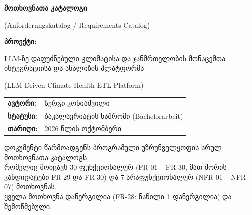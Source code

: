 \documentclass[11pt,a4paper]{article}
\begin{document}
\begin{titlepage}
\centering
\vspace*{2.5cm}

{\huge\bfseries\color{brandgreen} მოთხოვნათა კატალოგი\par}
\vspace{0.4cm}
{\Large (Anforderungskatalog / Requirements Catalog)\par}
\vspace{1.2cm}

{\large\textbf{პროექტი:}\par}
\vspace{0.2cm}
{\Large LLM-ზე დაფუძნებული კლიმატისა და ჯანმრთელობის მონაცემთა ინტეგრაციისა და ანალიზის პლატფორმა\par}
\vspace{0.3cm}
{\normalsize (LLM-Driven Climate-Health ETL Platform)\par}

\vspace{2.5cm}

\begin{tabular}{ll}
\textbf{ავტორი:} & სერგი კონიაშვილი \\
\textbf{სტატუსი:} & ბაკალავრიატის ნაშრომი (Bachelorarbeit) \\
\textbf{თარიღი:} & 2026 წლის ოქტომბერი \\
\end{tabular}

\vfill

{\footnotesize
დოკუმენტი წარმოადგენს პროგრამული უზრუნველყოფის სრულ მოთხოვნათა კატალოგს,\\
რომელიც მოიცავს 30 ფუნქციონალურ (FR-01 -- FR-30, მათ შორის კანდიდატები FR-29 და FR-30) და 7 არაფუნქციონალურ (NFR-01 -- NFR-07) მოთხოვნას.\\
ყველა მოთხოვნა დანერგილია (FR-28: ნაწილი 1 დანერგილია) და შემოწმებული.
\par}

\vspace*{1.5cm}
\end{titlepage}

\tableofcontents
\newpage

\end{document}
